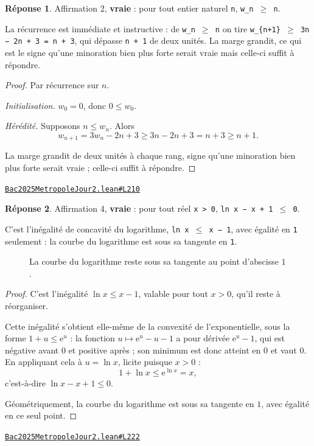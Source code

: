 \documentclass[11pt,a4paper]{article}
\theoremstyle{definition}
\theoremstyle{plain}
\theoremstyle{definition}
\newtheorem*{reponse}{Réponse}
\newcommand{\source}[2]{\par\smallskip\noindent\hfill{\footnotesize\href{#1}{\texttt{#2}}}\par\smallskip}
\begin{document}
\begin{reponse}
Affirmation 2, \textbf{vraie} : pour tout entier naturel \texttt{n}, \texttt{w\_n \(\ge\) n}.

La récurrence est immédiate et instructive : de \texttt{w\_n \(\ge\) n} on tire
\texttt{w\_\{n+1\} \(\ge\) 3n − 2n + 3 = n + 3}, qui dépasse \texttt{n + 1} de deux unités. La marge grandit,
ce qui est le signe qu'une minoration bien plus forte serait vraie \textemdash{} mais celle-ci
suffit à répondre.
\end{reponse}
\begin{proof}
Par récurrence sur $n$.

\emph{Initialisation.} $w_0 = 0$, donc $0 \le w_0$.

\emph{Hérédité.} Supposons $n \le w_n$. Alors
\[ w_{n+1} = 3w_n - 2n + 3 \ge 3n - 2n + 3 = n + 3 \ge n + 1 . \]

La marge grandit de deux unités à chaque rang, signe qu'une minoration bien plus forte
serait vraie ; celle-ci suffit à répondre.
\end{proof}
\source{https://github.com/Commutator-IO/learn-lean/blob/main/exams/2025/Bac2025MetropoleJour2.lean\#L210}{Bac2025MetropoleJour2.lean\#L210}

\begin{reponse}
Affirmation 4, \textbf{vraie} : pour tout réel \texttt{x > 0}, \texttt{ln x − x + 1 \(\le\) 0}.

C'est l'inégalité de concavité du logarithme, \texttt{ln x \(\le\) x − 1}, avec égalité en \texttt{1}
seulement : la courbe du logarithme est sous sa tangente en \texttt{1}.
\end{reponse}

\begin{figure}[h]
\centering

\caption{La courbe du logarithme reste sous sa tangente au point d'abscisse \(1\).}
\end{figure}
\begin{proof}
C'est l'inégalité $\ln x \le x - 1$, valable pour tout $x > 0$, qu'il reste à réorganiser.

Cette inégalité s'obtient elle-même de la convexité de l'exponentielle, sous la forme
$1 + u \le \mathrm{e}^u$ : la fonction $u \mapsto \mathrm{e}^u - u - 1$ a pour dérivée
$\mathrm{e}^u - 1$, qui est négative avant $0$ et positive après ; son minimum est donc
atteint en $0$ et vaut $0$. En appliquant cela à $u = \ln x$, licite puisque $x > 0$ :
\[ 1 + \ln x \le \mathrm{e}^{\ln x} = x , \]
c'est-à-dire $\ln x - x + 1 \le 0$.

Géométriquement, la courbe du logarithme est sous sa tangente en $1$, avec égalité en ce
seul point.
\end{proof}
\source{https://github.com/Commutator-IO/learn-lean/blob/main/exams/2025/Bac2025MetropoleJour2.lean\#L222}{Bac2025MetropoleJour2.lean\#L222}
\end{document}
